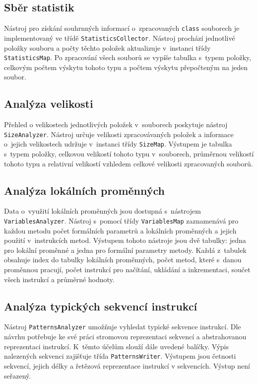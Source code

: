 \subsection{Sběr statistik}

Nástroj pro získání souhrnných informací o~zpracovaných \texttt{class} souborech je implementovaný ve třídě \texttt{StatisticsCollector}. Nástroj prochází jednotlivé položky souboru a  počty těchto položek aktualizuje v~instanci třídy \texttt{StatisticsMap}. Po zpracování všech souborů se vypíše tabulka s~typem položky, celkovým počtem výskytu tohoto typu a počtem výskytu přepočteným na jeden soubor. 

\subsection{Analýza velikosti}

Přehled o velikostech jednotlivých položek v~souborech poskytuje nástroj \texttt{SizeAnalyzer}. Nástroj určuje velikosti zpracovávaných položek a informace o~jejich velikostech udržuje v~instanci třídy \texttt{SizeMap}. Výstupem je tabulka s~typem položky, celkovou velikostí tohoto typu v~souborech, průměrnou velikostí tohoto typu a relativní velikostí vzhledem celkové velikosti zpracovaných souborů. 

\subsection{Analýza lokálních proměnných}

Data o~využití lokálních proměnných jsou dostupná s~nástrojem \texttt{VariablesAnalyzer}. Nástroj s~pomocí třídy \texttt{VariablesMap} zaznamenává pro každou metodu počet formálních parametrů a lokálních proměnných a jejich použití v~instrukcích metod. Výstupem tohoto nástroje jsou dvě tabulky: jedna pro lokální proměnné a jedna pro formální parametry metody. Každá z~tabulek obsahuje index do tabulky lokálních proměnných, počet metod, které s~danou proměnnou pracují, počet instrukcí pro načítání, ukládání a inkrementaci, součet všech instrukcí a průměrné hodnoty.

\subsection{Analýza typických sekvencí instrukcí}

Nástroj \texttt{PatternsAnalyzer} umožňuje vyhledat typické sekvence instrukcí. Dle návrhu potřebuje ke své práci stromovou reprezentaci sekvencí a abstrahovanou reprezentaci instrukcí. K~těmto účelům slouží dále uvedené balíčky. Výpis nalezených sekvenci zajišťuje třída \texttt{PatternsWriter}. Výstupem jsou četnosti sekvencí, jejich délky a řetězová reprezentace instrukcí v sekvencích. Výstup není seřazený.

